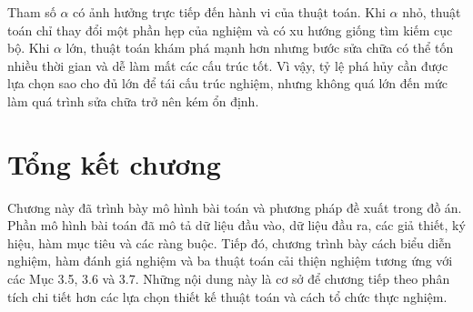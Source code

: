 Tham số $\alpha$ có ảnh hưởng trực tiếp đến hành vi của thuật toán. Khi $\alpha$ nhỏ, thuật toán chỉ thay đổi một phần hẹp của nghiệm và có xu hướng giống tìm kiếm cục bộ. Khi $\alpha$ lớn, thuật toán khám phá mạnh hơn nhưng bước sửa chữa có thể tốn nhiều thời gian và dễ làm mất các cấu trúc tốt. Vì vậy, tỷ lệ phá hủy cần được lựa chọn sao cho đủ lớn để tái cấu trúc nghiệm, nhưng không quá lớn đến mức làm quá trình sửa chữa trở nên kém ổn định.

\section{Tổng kết chương}

Chương này đã trình bày mô hình bài toán và phương pháp đề xuất trong đồ án. Phần mô hình bài toán đã mô tả dữ liệu đầu vào, dữ liệu đầu ra, các giả thiết, ký hiệu, hàm mục tiêu và các ràng buộc. Tiếp đó, chương trình bày cách biểu diễn nghiệm, hàm đánh giá nghiệm và ba thuật toán cải thiện nghiệm tương ứng với các Mục 3.5, 3.6 và 3.7. Những nội dung này là cơ sở để chương tiếp theo phân tích chi tiết hơn các lựa chọn thiết kế thuật toán và cách tổ chức thực nghiệm.
